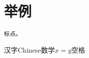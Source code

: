 \documentclass[11pt]{article}
\begin{document}
\section{举例}
\begin{verbatim}
标点。
\end{verbatim}
 
汉字Chinese数学$x=y$空格
\end{document}
